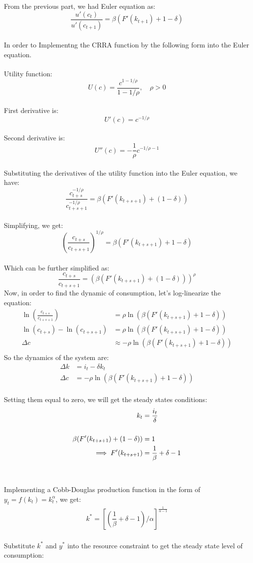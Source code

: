 \documentclass[12pt]{extarticle}
\begin{document}
From the previous part, we had Euler equation as:
$$ \frac{u'(c_t)}{u'(c_{t+1})} = \beta (F'(k_{t+1}) + 1 - \delta) $$\\
In order to Implementng the CRRA function by the following form into the Euler equation.\\\\
Utility function:
$$ U(c) = \frac{c^{1-1/\rho}}{1-1/\rho},\quad \rho > 0 $$\\
First derivative is:
$$U'(c) = c^{-1/\rho}$$\\
Second derivative is:
$$ U''(c) = -\frac{1}{\rho} c^{-1/\rho-1}$$\\
Substituting the derivatives of the utility function into the Euler equation, we have:
$$ \frac{c_{t+s}^{-1/\rho}}{c_{t+s+1}^{-1/\rho}} = \beta (F'(k_{t+s+1}) + (1-\delta)) $$\\
Simplifying, we get:
$$ \left(\frac{c_{t+s}}{c_{t+s+1}}\right)^{1/\rho} = \beta (F'(k_{t+s+1}) + 1-\delta)$$\\
Which can be further simplified as:
$$\frac{c_{t+s}}{c_{t+s+1}} = (\beta (F'(k_{t+s+1}) + (1-\delta)))^\rho$$
Now, in order to find the dynamic of consumption, let's log-linearize the equation:\\
\begin{align*}
    \ln\left(\frac{c_{t+s}}{c_{t+s+1}}\right) &= \rho \ln\left(\beta (F'(k_{t+s+1}) + 1-\delta)\right)\\
    \ln(c_{t+s}) - \ln(c_{t+s+1}) &= \rho \ln\left(\beta (F'(k_{t+s+1}) + 1-\delta)\right)\\
    \Delta c &\approx -\rho \ln\left(\beta (F'(k_{t+s+1}) + 1-\delta)\right)\\
\end{align*}
So the dynamics of the system are:
\setcounter{equation}{0}
\begin{align}
    \Delta k &=i_t-\delta k_t\\
    \Delta c &= -\rho \ln\left(\beta (F'(k_{t+s+1}) + 1-\delta)\right)
\end{align}\\
Setting them equal to zero, we will get the steady states conditions:\\
\setcounter{equation}{0}
\begin{align}
    k_t&=\dfrac{i_t}{\delta}\\\notag\\
    \beta (F'(k_{t+s+1}) + (1-\delta))&=1\notag\\ 
    \implies F'(k_{t+s+1}) & = \dfrac{1}{\beta}+\delta-1 
\end{align}\\\\
Implementing a Cobb-Douglas production function in the form of $y_t=f(k_t)=k_t^\alpha$, we get:
\begin{align*}
    k^*=\left[(\dfrac{1}{\beta}+\delta-1)/\alpha\right]^{\frac{1}{\alpha-1}} \tag{2}
\end{align*}\\
Substitute \(k^*\) and \(y^*\) into the resource constraint to get the steady state level of consumption:
\end{document}
